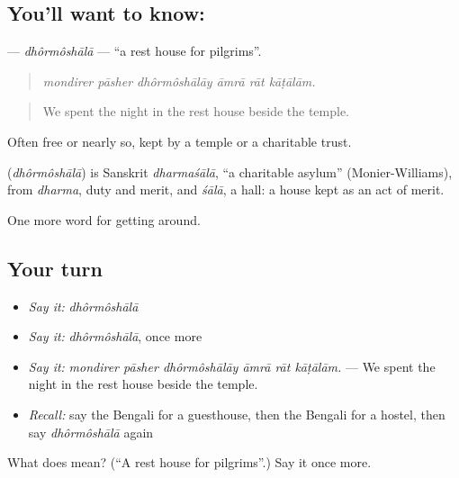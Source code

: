 \subsection*{You'll want to know: }
\textbf{} — \emph{dhôrmôshālā} — \textquotedblleft{}a rest house for pilgrims\textquotedblright{}.

\begin{quote}
     
\end{quote}

\begin{quote}
\emph{mondirer pāsher dhôrmôshālāy āmrā rāt kāṭālām.}
\end{quote}

\begin{quote}
We spent the night in the rest house beside the temple.
\end{quote}

Often free or nearly so, kept by a temple or a charitable trust.

\begin{cousinweb}
\textbf{} (\emph{dhôrmôshālā}) is Sanskrit \emph{dharmaśālā}, \textquotedblleft{}a charitable asylum\textquotedblright{} (Monier-Williams), from \emph{dharma}, duty and merit, and \emph{śālā}, a hall: a house kept as an act of merit.
\end{cousinweb}

\begin{grammarlens}[title={What you've built}]
One more word for getting around.
\end{grammarlens}

\subsection*{Your turn}
\begin{itemize}
\raggedright
  \item \emph{Say it:} \emph{dhôrmôshālā}
  \item \emph{Say it:} \emph{dhôrmôshālā}, once more
  \item \emph{Say it:} \emph{mondirer pāsher dhôrmôshālāy āmrā rāt kāṭālām.} — We spent the night in the rest house beside the temple.
  \item \emph{Recall:} say the Bengali for a guesthouse, then the Bengali for a hostel, then say \emph{dhôrmôshālā} again
\end{itemize}

\begin{tcolorbox}[breakable,colback=teal!4,colframe=teal!35!black,title={Before you move on}]
What does  mean? (\textquotedblleft{}A rest house for pilgrims\textquotedblright{}.) Say it once more.
\end{tcolorbox}
